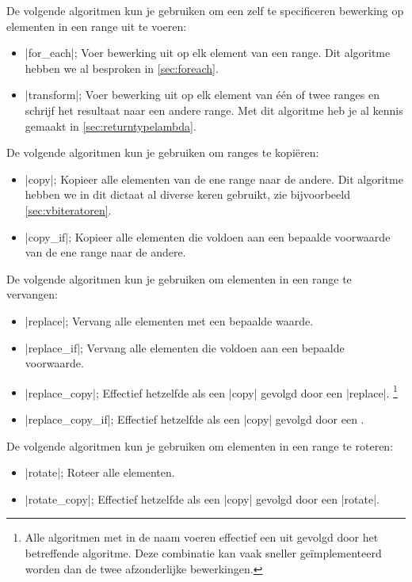 \begin{cpplstShortInline}
De volgende algoritmen kun je gebruiken om een zelf te specificeren bewerking op elementen in een range uit te voeren:
\begin{itemize}
	\item |for_each|; Voer bewerking uit op elk element van een range.
	Dit algoritme hebben we al besproken in \cref{sec:foreach}.
	\item |transform|; Voer bewerking uit op elk element van één of twee ranges en schrijf het resultaat naar een andere range.
	Met dit algoritme heb je al kennis gemaakt in \cref{sec:returntypelambda}.
\end{itemize}

De volgende algoritmen kun je gebruiken om ranges te kopiëren:
\begin{itemize}
	\item |copy|; Kopieer alle elementen van de ene range naar de andere.
	Dit algoritme hebben we in dit dictaat al diverse keren gebruikt, zie bijvoorbeeld \cref{sec:vbiteratoren}.
	\item |copy_if|; Kopieer alle elementen die voldoen aan een bepaalde voorwaarde van de ene range naar de andere.
\end{itemize}

De volgende algoritmen kun je gebruiken om elementen in een range te vervangen:
\begin{itemize}
	\item |replace|; Vervang alle elementen met een bepaalde waarde.
	\item |replace_if|; Vervang alle elementen die voldoen aan een bepaalde voorwaarde.
	\item |replace_copy|; Effectief hetzelfde als een |copy| gevolgd door een |replace|.%
	\footnote{%
		Alle algoritmen met  in de naam voeren effectief een  uit gevolgd door het betreffende algoritme.
		Deze combinatie kan vaak sneller geïmplementeerd worden dan de twee afzonderlijke bewerkingen.
	}
	\item |replace_copy_if|;  Effectief hetzelfde als een |copy| gevolgd door een .
\end{itemize}

De volgende algoritmen kun je gebruiken om elementen in een range te roteren:
\begin{itemize}
	\item |rotate|; Roteer alle elementen.
	\item |rotate_copy|; Effectief hetzelfde als een |copy| gevolgd door een |rotate|.
\end{itemize}


\end{cpplstShortInline}
